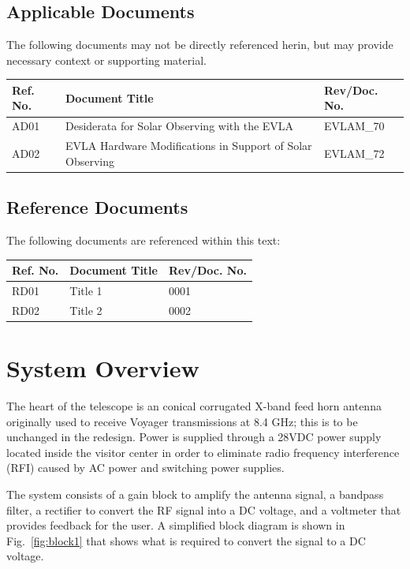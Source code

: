 \documentclass[titlepage]{article}
\begin{document}
\subsection{Applicable Documents}
The following documents may not be directly referenced herin, but may provide necessary context or supporting material.
\begin{center}
\begin{tabular}{|m{2cm}|m{7cm}|m{2.5cm}|} \hline
    \rowcolor{nraoblue}
    Ref. No. & Document Title & Rev/Doc. No. \\ \hline
    AD01 & Desiderata for Solar Observing with the EVLA & EVLAM\_70 \\ 
    \hline
    AD02 & EVLA Hardware Modifications in Support of Solar Observing & EVLAM\_72 \\
    \hline
\end{tabular}
\end{center}

\subsection{Reference Documents}
The following documents are referenced within this text:
\begin{center}
\begin{tabular}{|m{2cm}|m{7cm}|m{2.5cm}|} \hline
    \rowcolor{nraoblue}
    Ref. No. & Document Title & Rev/Doc. No. \\ \hline
    RD01 & Title 1 & 0001 \\
    RD02 & Title 2 & 0002 \\
    \hline
\end{tabular}
\end{center}

\section{System Overview}
The heart of the telescope is an conical corrugated X-band feed horn antenna originally used to receive Voyager transmissions at 8.4 GHz; this is to be unchanged in the redesign. Power is supplied through a 28VDC power supply located inside the visitor center in order to eliminate radio frequency interference (RFI) caused by AC power and switching power supplies.

The system consists of a gain block to amplify the antenna signal, a bandpass filter, a rectifier to convert the RF signal into a DC voltage, and a voltmeter that provides feedback for the user. A simplified block diagram is shown in Fig.~\ref{fig:block1} that shows what is required to convert the signal to a DC voltage.
\end{document}
